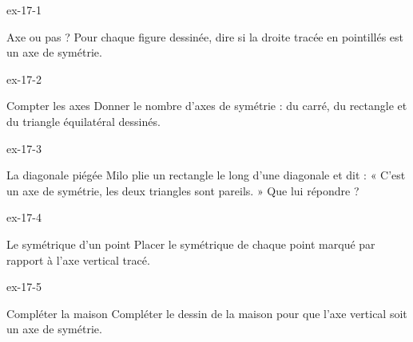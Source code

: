 \clearpage{}
\begin{blocLivre}{ex-17-1}\begin{exercice}[1]{Axe ou pas ?}
Pour chaque figure dessinée, dire si la droite tracée en pointillés est un axe de symétrie.
\label{fig-ex-17-1}
\end{exercice}\end{blocLivre}
\begin{blocLivre}{ex-17-2}\begin{exercice}[1]{Compter les axes}
Donner le nombre d’axes de symétrie : du carré, du rectangle et du triangle équilatéral dessinés.
\label{fig-ex-17-2}
\end{exercice}\end{blocLivre}
\begin{blocLivre}{ex-17-3}\begin{exercice}[1]{La diagonale piégée}
Milo plie un rectangle le long d’une diagonale et dit : « C’est un axe de symétrie, les deux triangles sont pareils. » Que lui répondre ?
\label{fig-ex-17-3}
\end{exercice}\end{blocLivre}
\begin{blocLivre}{ex-17-4}\begin{exercice}[1]{Le symétrique d’un point}
Placer le symétrique de chaque point marqué par rapport à l’axe vertical tracé.
\label{fig-ex-17-4}
\end{exercice}\end{blocLivre}
\begin{blocLivre}{ex-17-5}\begin{exercice}[1]{Compléter la maison}
Compléter le dessin de la maison pour que l’axe vertical soit un axe de symétrie.
\label{fig-ex-17-5}
\end{exercice}\end{blocLivre}

